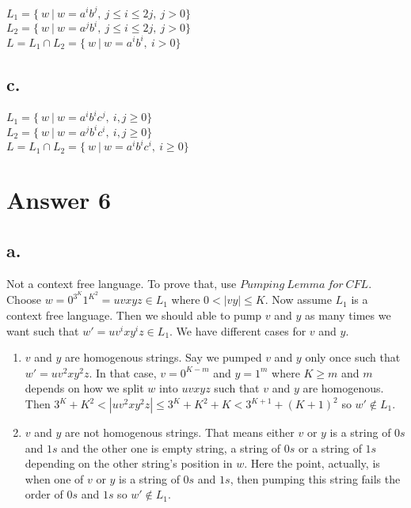 \documentclass[12pt]{article}
\begin{document}
$L_1=\{\ w\ |\ w=a^ib^j,\ j\leq i\leq 2j,\ j>0\}$\\
$L_2=\{\ w\ |\ w=a^jb^i,\ j\leq i\leq 2j,\ j>0\}$\\
$L=L_1\cap L_2=\{\ w\ |\ w=a^ib^i,\ i>0\}$

\subsection*{c.}

$L_1=\{\ w\ |\ w=a^ib^ic^j,\ i,j\geq 0\}$\\
$L_2=\{\ w\ |\ w=a^jb^ic^i,\ i,j\geq 0\}$\\
$L=L_1\cap L_2=\{\ w\ |\ w=a^ib^ic^i,\ i\geq 0\}$

\section*{Answer 6}

\subsection*{a.}

Not a context free language. To prove that, use $Pumping\ Lemma\ for\ CFL$.\\
Choose $w = 0^{3^K}1^{K^2} = uvxyz\in L_1$ where $0 <|vy| \leq  K$. Now assume $L_1$ is a context free language. Then we should able to pump $v$ and $y$ as many times we want such that $w' = uv^ixy^iz\in L_1$. We have different cases for $v$ and $y$.

\begin{enumerate}
    \item{$v$ and $y$ are homogenous strings.}
        Say we pumped $v$ and $y$ only once such that $w'=uv^2xy^2z$. In that case, $v=0^{K-m}$ and $y=1^{m}$ where $K\geq m$ and $m$ depends on how we split $w$ into $uvxyz$ such that $v$ and $y$ are homogenous.\\
        Then $3^K + K^2 < |uv^2xy^2z| \leq 3^K + K^2 + K < 3^{K + 1} + (K + 1)^2$ so $w'\notin L_1$.
    \item{$v$ and $y$ are not homogenous strings.}
        That means either $v$ or $y$ is a string of $0s$ and $1s$ and the other one is empty string, a string of $0s$ or a string of $1s$ depending on the other string's position in $w$. Here the point, actually, is when one of $v$ or $y$ is a string of $0s$ and $1s$, then pumping this string fails the order of $0s$ and $1s$ so $w'\notin L_1$.
\end{enumerate}
\end{document}
